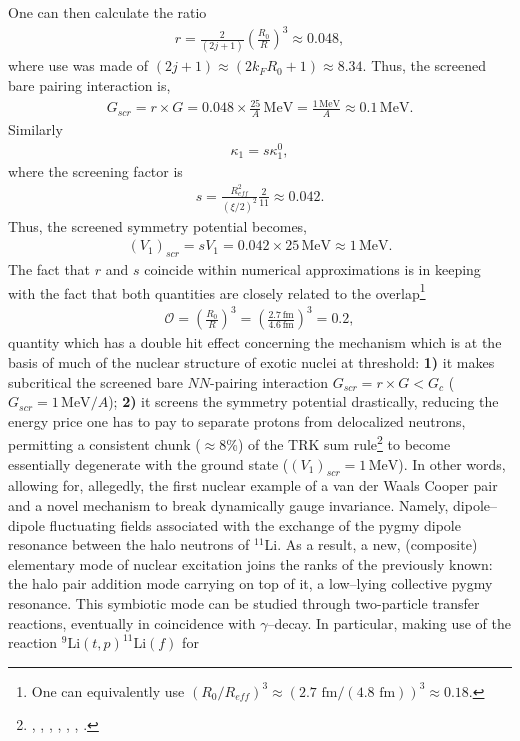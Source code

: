   One can then calculate the ratio
    \begin{align}
r=\frac{2}{(2j+1)}\left(\frac{R_0}{R}\right)^3\approx 0.048,
   \end{align}
 where use was made of $(2j+1)\approx (2k_FR_0+1)\approx 8.34$. Thus, the screened bare pairing interaction is,
\begin{align}
G_{scr}=r\times G=0.048\times\frac{25}{A}\, \text{MeV}=\frac{1\,\text{MeV}}{A}\approx 0.1\,\text{MeV}.
\end{align}
 Similarly
 \begin{align}
\kappa_1=s\kappa_1^0,
 \end{align}
 where the screening factor is 
  \begin{align}
s=\frac{R_{eff}^2}{\left(\xi/2\right)^2}\frac{2}{11}\approx 0.042.
  \end{align}
Thus, the screened symmetry potential becomes,
  \begin{align}
(V_1)_{scr}=sV_1=0.042\times 25\, \text{MeV}\approx1\,\text{MeV}.
  \end{align}
The fact that $r$ and $s$ coincide within numerical approximations is in keeping with the fact that both quantities are closely related to the overlap\footnote{One can equivalently use $\left(R_0/R_{eff}\right)^3\approx\left( 2.7\text{ fm}/(4.8\text{ fm})\right)^3\approx0.18$.}
  \begin{align}
\mathcal{O}=\left(\frac{R_0}{R}\right)^3=\left(\frac{2.7\,\text{fm}}{4.6\,\text{fm}}\right)^3=0.2,
  \end{align}
quantity which has a double hit effect concerning the mechanism which is at the basis of much of the nuclear structure of exotic nuclei at threshold: \textbf{1)} it makes subcritical the screened bare $NN$-pairing interaction $G_{scr}=r\times G<G_c$ ($G_{scr}=1\,\text{MeV}/A$); \textbf{2)} it screens the symmetry potential drastically, reducing the energy price one has to pay to separate protons from delocalized neutrons, permitting a consistent chunk ($\approx 8$\%) of the TRK sum rule\footnote{\cite{Zinser:97}, \cite{Nakamura:06}, \cite{Shimoura:95}, \cite{Ieki:93}, \cite{Sackett:93}, \cite{Kanungo:15}, \cite{Kobayashi:89}.} to  become essentially degenerate with the  ground state ($(V_1)_{scr}=1 \,\text{MeV}$). In other words,  allowing for, allegedly, the first nuclear example of a van der Waals Cooper pair and a novel mechanism to break dynamically gauge invariance. Namely, dipole--dipole fluctuating fields associated with the exchange of the pygmy dipole resonance between the halo neutrons of $^{11}$Li. As a result, a new, (composite) elementary mode of nuclear excitation joins the ranks of the previously known: the halo pair addition mode carrying on top of it, a low--lying collective pygmy resonance. This symbiotic mode can be studied through two-particle transfer reactions, eventually in coincidence with $\gamma$--decay. In particular, making use of the reaction $^{9}$Li$(t,p)^{11}$Li$(f)$ for 
